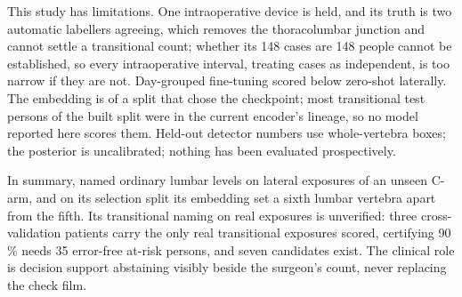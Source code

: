 This study has limitations. One intraoperative device is held, and its truth is two automatic labellers
agreeing, which removes the thoracolumbar junction and cannot settle a transitional count; whether its 148 cases
are 148 people cannot be established, so every intraoperative interval, treating cases as independent, is too
narrow if they are not. Day-grouped fine-tuning scored below zero-shot laterally.
The embedding is of a split that chose the checkpoint; most
transitional test persons of the built split were in the current encoder's lineage, so no model reported here scores them.
Held-out detector numbers use whole-vertebra boxes; the posterior is uncalibrated; nothing has been evaluated prospectively.

In summary, \netname{} named ordinary lumbar levels on lateral exposures of an unseen C-arm, and on its selection
split its embedding set a sixth lumbar vertebra apart from the fifth. Its transitional naming on real exposures
is unverified: three cross-validation patients carry the only real transitional exposures scored, certifying
90\,\% needs 35 error-free at-risk persons, and seven candidates exist. The clinical role is decision support abstaining visibly beside the surgeon's
count, never replacing the check film.
